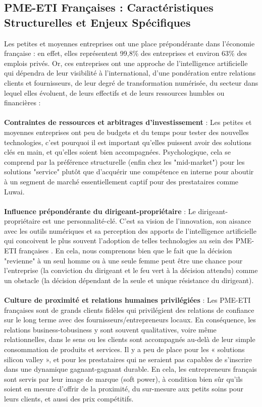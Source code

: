 \subsection{PME-ETI Françaises : Caractéristiques Structurelles et Enjeux Spécifiques}

Les petites et moyennes entreprises ont une place prépondérante dans l'économie française : en effet, elles représentent 99,8\% des entreprises et environ 63\% des emplois privés. Or, ces entreprises ont une approche de l’intelligence artificielle qui dépendra de leur visibilité à l’international, d’une pondération entre relations clients et fournisseurs, de leur degré de transformation numérisée, du secteur dans lequel elles évoluent, de leurs effectifs et de leurs ressources humbles ou financières\cite{bpifrance2025ia, france_strategie2025make} :
\\\\
\textbf{Contraintes de ressources et arbitrages d'investissement} : Les petites et moyennes entreprises ont peu de budgets et du temps pour tester des nouvelles technologies, c’est pourquoi il est important qu’elles puissent avoir des solutions clés en main, et qu’elles soient bien accompagnées. Psychologique, cela se comprend par la préférence structurelle (enfin chez les "mid-market") pour les solutions "service" plutôt que d’acquérir une compétence en interne pour aboutir à un segment de marché essentiellement captif pour des prestataires comme Luwai.
\\\\
\textbf{Influence prépondérante du dirigeant-propriétaire} : Le dirigeant-propriétaire est une personnalité-clé. C’est sa vision de l’innovation, son aisance avec les outils numériques et sa perception des apports de l’intelligence artificielle qui concoivent le plus souvent l’adoption de telles technologies au sein des PME-ETI françaises \cite{bpifrance2017dirigeants}. En cela, nous comprenons bien que le fait que la décision "revienne" à un seul homme ou à une seule femme peut être une chance pour l’entreprise (la conviction du dirigeant et le feu vert à la décision attendu) comme un obstacle (la décision dépendant de la seule et unique résistance du dirigeant).
\\\\
\textbf{Culture de proximité et relations humaines privilégiées} : Les PME-ETI françaises sont de grands clients fidèles qui privilégient des relations de confiance sur le long terme avec des fournisseurs/entrepreneurs locaux. En conséquence, les relations business-tobusiness y sont souvent qualitatives, voire même relationnelles, dans le sens ou les clients sont accompagnés au-delà de leur simple consommation de produits et services. Il y a peu de place pour les « solutions silicon valley », et pour les prestataires qui ne seraient pas capables de s'inscrire dans une dynamique gagnant-gagnant durable. \cite{sage2025pme_transformation} En cela, les entrepreneurs français sont servis par leur image de marque (soft power), à condition bien sûr qu'ils soient en mesure d'offrir de la proximité, du sur-mesure aux petits soins pour leurs clients, et aussi des prix compétitifs.
